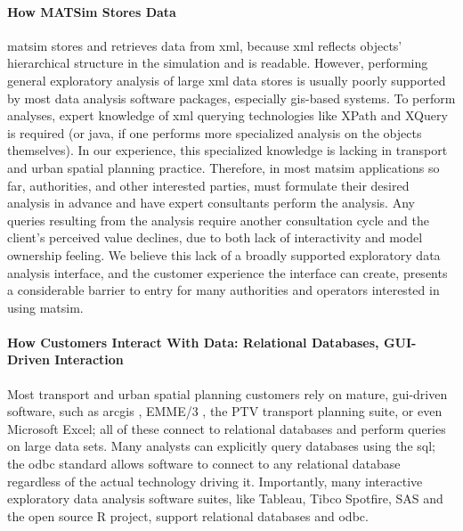 \paragraph{How MATSim Stores Data}
\gls{matsim} stores and retrieves data from \gls{xml}, because \gls{xml} reflects objects' hierarchical structure in the simulation and is readable. However, performing general exploratory analysis of large \gls{xml} data stores is usually poorly supported by most data analysis software packages, especially \gls{gis}-based systems. To perform analyses, expert knowledge of \gls{xml} querying technologies like XPath and XQuery is required (or \gls{java}, if one performs more specialized analysis on the objects themselves). In our experience, this specialized knowledge is lacking in transport and urban spatial planning practice. Therefore, in most \gls{matsim} applications so far, authorities, and other interested parties, must formulate their desired analysis in advance and have expert consultants perform the analysis. Any queries resulting from the analysis require another consultation cycle and the client's perceived value declines, due to both lack of interactivity and model ownership feeling. We believe this lack of a broadly supported exploratory data analysis interface, and the customer experience the interface can create, presents a considerable barrier to entry for many authorities and operators interested in using \gls{matsim}.

\paragraph{How Customers Interact With Data: Relational Databases, GUI-Driven Interaction}
Most transport and urban spatial planning customers rely on mature, \gls{gui}-driven software, such as \gls{arcgis} \citep{ARC_GIS_2011}, EMME/3 \citep{EMME_Webpage_2015}, the PTV \citep{PTV_Webpage_2009} transport planning suite, or even Microsoft Excel; all of these connect to relational databases and perform queries on large data sets. Many analysts can explicitly query databases using the \gls{sql}; the \gls{odbc} standard allows software to connect to any relational database regardless of the actual technology driving it. Importantly, many interactive exploratory data analysis software suites, like Tableau, Tibco Spotfire, SAS and the open source R project, support relational databases and \gls{odbc}.


